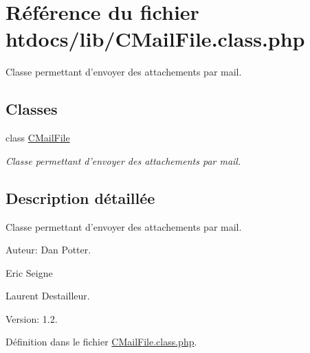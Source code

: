 \hypertarget{CMailFile_8class_8php}{
\section{R\'{e}f\'{e}rence du fichier htdocs/lib/CMail\-File.class.php}
\label{CMailFile_8class_8php}
}
Classe permettant d'envoyer des attachements par mail.  


\subsection*{Classes}
\begin{CompactItemize}
\item 
class \hyperlink{classCMailFile}{CMail\-File}
\begin{CompactList}\small\item\em Classe permettant d'envoyer des attachements par mail. \item\end{CompactList}\end{CompactItemize}


\subsection{Description d\'{e}taill\'{e}e}
Classe permettant d'envoyer des attachements par mail. 

\begin{Desc}
\item[Auteur:]Dan Potter. 

Eric Seigne 

Laurent Destailleur. \end{Desc}
\begin{Desc}
\item[Version:]1.2.\end{Desc}


D\'{e}finition dans le fichier \hyperlink{CMailFile_8class_8php-source}{CMail\-File.class.php}.